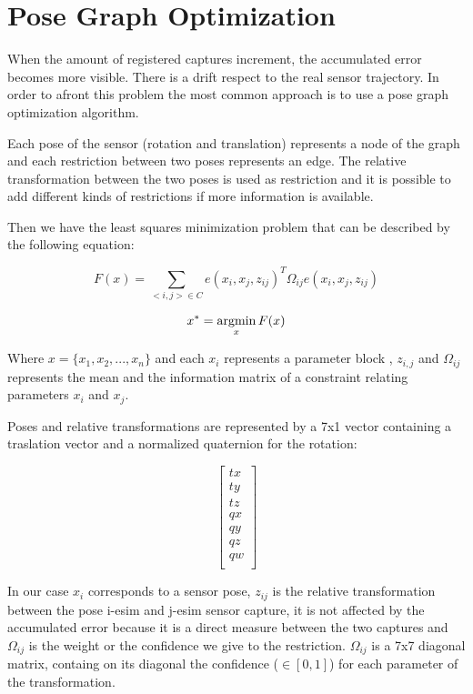 \section{Pose Graph Optimization}

When the amount of registered captures increment, the accumulated error 
becomes more visible. There is a drift respect to the real sensor trajectory. 
In order to afront this problem the most common approach is to use a pose graph 
optimization algorithm. 

Each pose of the sensor (rotation and translation) represents a node of the 
graph and each restriction between two poses represents an edge. The relative 
transformation between the two poses is used as restriction and it is possible 
to add different kinds of restrictions if more information is available.

Then we have the least squares minimization problem that can be described by the following equation:

$$ F(x) = \sum\limits_{<i,j> \in C } e(x_i,x_j,z_{ij})^T \Omega_{ij} e(x_i,x_j,z_{ij}) $$

$$ x^* = \mathop{\rm argmin}_x F(x) $$

Where $x=\{x_1,x_2,...,x_n\}$ and each $x_i$ represents a parameter block , $z_{i,j}$ and $\Omega_{ij}$ represents the mean  
 and the information matrix  of a constraint 
relating parameters $x_i$ and $x_j$.

Poses and relative transformations are represented by a 7x1 vector containing a traslation vector
 and a normalized quaternion for the rotation:

$$ \begin{bmatrix}
tx \\
ty \\
tz \\
qx \\
qy \\
qz \\
qw \\
\end{bmatrix}
$$

In our case $x_i$ corresponds to a sensor pose, $z_{ij}$ is the 
relative transformation between the pose i-esim and j-esim sensor capture, it is not affected by the accumulated error 
because it is a direct measure between the two captures and $\Omega_{ij}$ is the weight or 
the confidence we give to the restriction. $\Omega_{ij}$ is a 7x7 diagonal matrix, containg on its diagonal the confidence ($\in [0,1]$) for each 
parameter of the transformation. 

